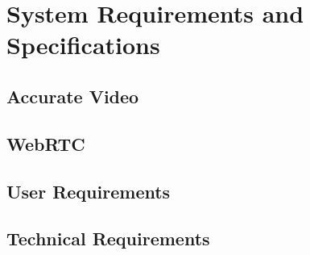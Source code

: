 \documentclass[12pt,a4paper]{article}
\begin{document}
%
%
%
%
%
%
%
%
\newpage
\section{System Requirements and Specifications} \label{section:requirements}


\subsection{Accurate Video}


\subsection{WebRTC}


\subsection{User Requirements}


\subsection{Technical Requirements}





%
%
%
%
%
%
%
%
\newpage
\end{document}
